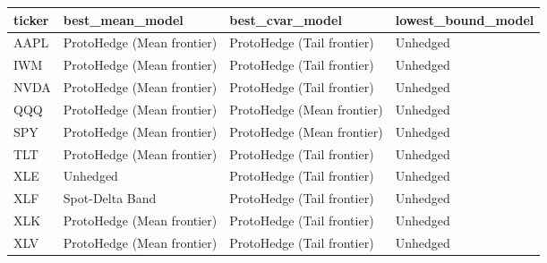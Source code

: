 \begin{tabular}{llll}
\toprule
ticker & best_mean_model & best_cvar_model & lowest_bound_model \\
\midrule
AAPL & ProtoHedge (Mean frontier) & ProtoHedge (Tail frontier) & Unhedged \\
IWM & ProtoHedge (Mean frontier) & ProtoHedge (Tail frontier) & Unhedged \\
NVDA & ProtoHedge (Mean frontier) & ProtoHedge (Tail frontier) & Unhedged \\
QQQ & ProtoHedge (Mean frontier) & ProtoHedge (Mean frontier) & Unhedged \\
SPY & ProtoHedge (Mean frontier) & ProtoHedge (Mean frontier) & Unhedged \\
TLT & ProtoHedge (Mean frontier) & ProtoHedge (Tail frontier) & Unhedged \\
XLE & Unhedged & ProtoHedge (Tail frontier) & Unhedged \\
XLF & Spot-Delta Band & ProtoHedge (Tail frontier) & Unhedged \\
XLK & ProtoHedge (Mean frontier) & ProtoHedge (Tail frontier) & Unhedged \\
XLV & ProtoHedge (Mean frontier) & ProtoHedge (Tail frontier) & Unhedged \\
\bottomrule
\end{tabular}
